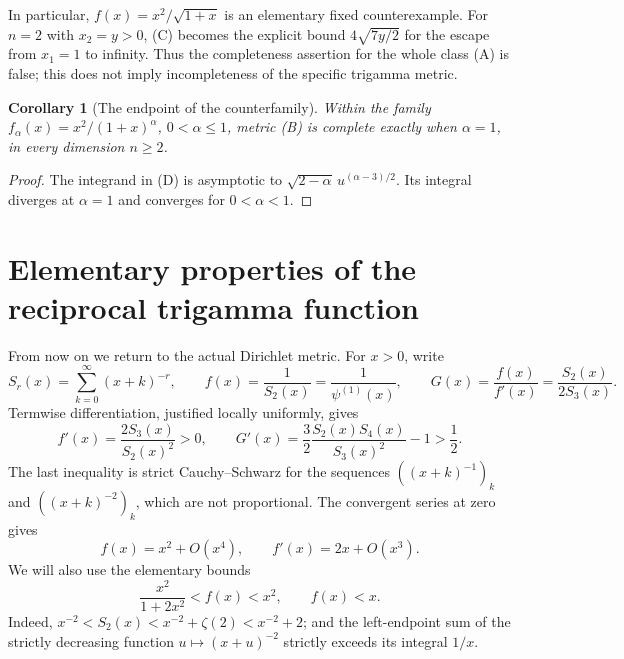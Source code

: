 \documentclass[11pt,a4paper]{article}
\newtheorem{corollary}{Corollary}
\begin{document}
In particular, $f(x)=x^2/\sqrt{1+x}$ is an elementary fixed
counterexample. For $n=2$ with $x_2=y>0$, (C) becomes the explicit bound
$4\sqrt{7y/2}$ for the escape from $x_1=1$ to infinity.
Thus the completeness assertion for the whole class (A) is false;
this does not imply incompleteness of the specific trigamma metric.

\begin{corollary}[The endpoint of the counterfamily]
Within the family $f_\alpha(x)=x^2/(1+x)^\alpha$, $0<\alpha\le1$,
metric (B) is complete exactly when $\alpha=1$, in every dimension
$n\ge2$.
\end{corollary}
\begin{proof}
The integrand in (D) is asymptotic to
$\sqrt{2-\alpha}\,u^{(\alpha-3)/2}$. Its integral diverges at
$\alpha=1$ and converges for $0<\alpha<1$.
\end{proof}

\section{Elementary properties of the reciprocal trigamma function}
From now on we return to the actual Dirichlet metric. For $x>0$, write
\[
 S_r(x)=\sum_{k=0}^{\infty}(x+k)^{-r},\qquad
 f(x)=\frac1{S_2(x)}=\frac1{\psi^{(1)}(x)},\qquad
 G(x)=\frac{f(x)}{f'(x)}=\frac{S_2(x)}{2S_3(x)}.
\]
Termwise differentiation, justified locally uniformly, gives
\[
 f'(x)=\frac{2S_3(x)}{S_2(x)^2}>0,
 \qquad
 G'(x)=\frac32\frac{S_2(x)S_4(x)}{S_3(x)^2}-1>\frac12.
\tag{1}
\]
The last inequality is strict Cauchy--Schwarz for the sequences
$((x+k)^{-1})_k$ and $((x+k)^{-2})_k$, which are not proportional.
The convergent series at zero gives
\[
 f(x)=x^2+O(x^4),\qquad f'(x)=2x+O(x^3).
\tag{2}
\]
We will also use the elementary bounds
\[
 \frac{x^2}{1+2x^2}<f(x)<x^2,\qquad f(x)<x.
\tag{3}
\]
Indeed, $x^{-2}<S_2(x)<x^{-2}+\zeta(2)<x^{-2}+2$;
and the left-endpoint sum of the strictly decreasing function
$u\mapsto(x+u)^{-2}$ strictly exceeds its integral $1/x$.
\end{document}

